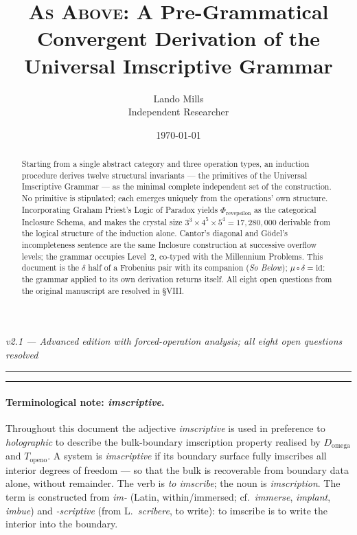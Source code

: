 \documentclass[12pt,a4paper]{article}
\begin{document}
\title{\textsc{As Above}: A Pre-Grammatical Convergent Derivation of the Universal Imscriptive Grammar}
\author{Lando Mills \\ \normalsize Independent Researcher}
\date{\today}

\maketitle

\emph{v2.1 --- Advanced edition with forced-operation analysis; all eight open questions resolved}

\begin{center}
\rule{0.5\textwidth}{0.4pt}
\end{center}

\begin{abstract}
Starting from a single abstract category and three operation types, an induction procedure derives twelve structural invariants --- the primitives of the Universal Imscriptive Grammar --- as the minimal complete independent set of the construction. No primitive is stipulated; each emerges uniquely from the operations' own structure. Incorporating Graham Priest's Logic of Paradox yields $\Phi_{\text{revepsilon}}$ as the categorical Inclosure Schema, and makes the crystal size $3^3 \times 4^5 \times 5^4 = 17{,}280{,}000$ derivable from the logical structure of the induction alone. Cantor's diagonal and G\"odel's incompleteness sentence are the same Inclosure construction at successive overflow levels; the grammar occupies Level~2, co-typed with the Millennium Problems. This document is the $\delta$ half of a Frobenius pair with its companion (\emph{So Below}); $\mu \circ \delta = \text{id}$: the grammar applied to its own derivation returns itself. All eight open questions from the original manuscript are resolved in \S VIII.
\end{abstract}

\begin{center}
\rule{0.5\textwidth}{0.4pt}
\end{center}

\paragraph*{Terminological note: \emph{imscriptive}.}
Throughout this document the adjective \emph{imscriptive} is used in preference to \emph{holographic} to describe the bulk-boundary imscription property realised by $D_{\text{omega}}$ and $T_{\text{openo}}$. A system is \emph{imscriptive} if its boundary surface fully imscribes all interior degrees of freedom --- so that the bulk is recoverable from boundary data alone, without remainder. The verb is \emph{to imscribe}; the noun is \emph{imscription}. The term is constructed from \emph{im-} (Latin, within/immersed; cf.\ \emph{immerse}, \emph{implant}, \emph{imbue}) and \emph{-scriptive} (from L.\ \emph{scribere}, to write): to imscribe is to write the interior into the boundary.
\end{document}
